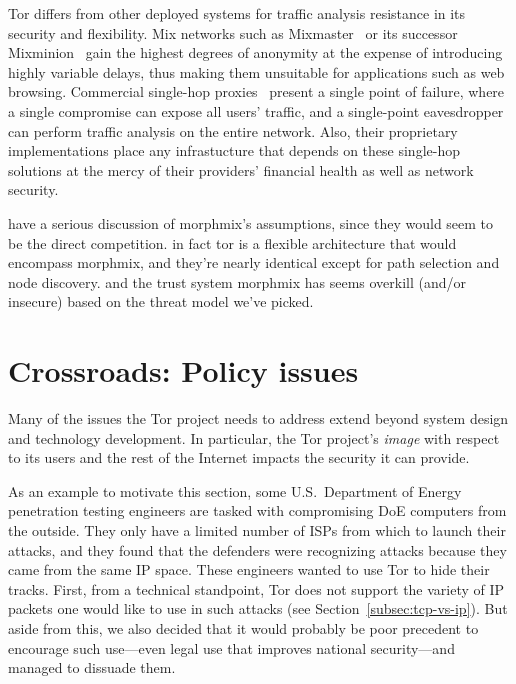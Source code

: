 \documentclass{llncs}
\begin{document}
Tor differs from other deployed systems for traffic analysis resistance
in its security and flexibility.  Mix networks such as
Mixmaster~\cite{mixmaster-spec} or its successor Mixminion~\cite{minion-design}
gain the highest degrees of anonymity at the expense of introducing highly
variable delays, thus making them unsuitable for applications such as web
browsing.  Commercial single-hop
proxies~\cite{anonymizer} present a single point of failure, where
a single compromise can expose all users' traffic, and a single-point
eavesdropper can perform traffic analysis on the entire network.
Also, their proprietary implementations place any infrastucture that
depends on these single-hop solutions at the mercy of their providers'
financial health as well as network security.


have a serious discussion of morphmix's assumptions, since they would
seem to be the direct competition. in fact tor is a flexible architecture
that would encompass morphmix, and they're nearly identical except for
path selection and node discovery. and the trust system morphmix has
seems overkill (and/or insecure) based on the threat model we've picked.


\section{Crossroads: Policy issues}
\label{sec:crossroads-policy}

Many of the issues the Tor project needs to address extend beyond
system design and technology development. In particular, the
Tor project's \emph{image} with respect to its users and the rest of
the Internet impacts the security it can provide.

As an example to motivate this section, some U.S.~Department of Energy
penetration testing engineers are tasked with compromising DoE computers
from the outside. They only have a limited number of ISPs from which to
launch their attacks, and they found that the defenders were recognizing
attacks because they came from the same IP space. These engineers wanted
to use Tor to hide their tracks. First, from a technical standpoint,
Tor does not support the variety of IP packets one would like to use in
such attacks (see Section~\ref{subsec:tcp-vs-ip}). But aside from this,
we also decided that it would probably be poor precedent to encourage
such use---even legal use that improves national security---and managed
to dissuade them.
\end{document}
